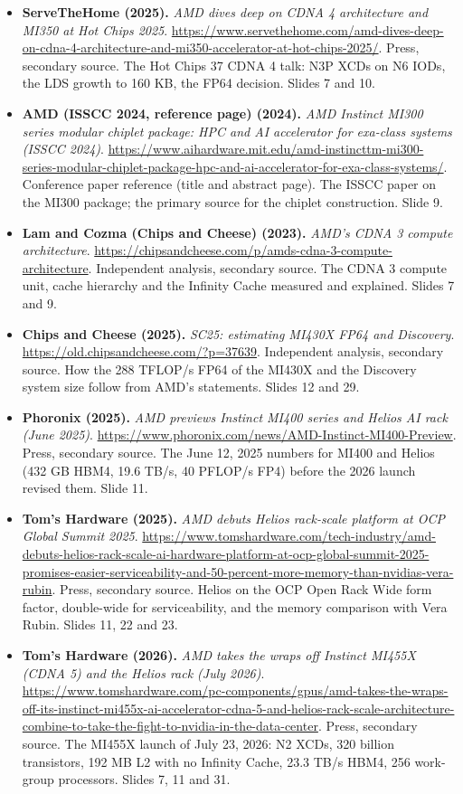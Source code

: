 \begin{itemize}[leftmargin=1.2em,itemsep=3pt]
\item \textbf{ServeTheHome (2025).} \textit{AMD dives deep on CDNA 4 architecture and MI350 at Hot Chips 2025}. \url{https://www.servethehome.com/amd-dives-deep-on-cdna-4-architecture-and-mi350-accelerator-at-hot-chips-2025/}. Press, secondary source. The Hot Chips 37 CDNA 4 talk: N3P XCDs on N6 IODs, the LDS growth to 160 KB, the FP64 decision. Slides 7 and 10.
\item \textbf{AMD (ISSCC 2024, reference page) (2024).} \textit{AMD Instinct MI300 series modular chiplet package: HPC and AI accelerator for exa-class systems (ISSCC 2024)}. \url{https://www.aihardware.mit.edu/amd-instincttm-mi300-series-modular-chiplet-package-hpc-and-ai-accelerator-for-exa-class-systems/}. Conference paper reference (title and abstract page). The ISSCC paper on the MI300 package; the primary source for the chiplet construction. Slide 9.
\item \textbf{Lam and Cozma (Chips and Cheese) (2023).} \textit{AMD's CDNA 3 compute architecture}. \url{https://chipsandcheese.com/p/amds-cdna-3-compute-architecture}. Independent analysis, secondary source. The CDNA 3 compute unit, cache hierarchy and the Infinity Cache measured and explained. Slides 7 and 9.
\item \textbf{Chips and Cheese (2025).} \textit{SC25: estimating MI430X FP64 and Discovery}. \url{https://old.chipsandcheese.com/?p=37639}. Independent analysis, secondary source. How the 288 TFLOP/s FP64 of the MI430X and the Discovery system size follow from AMD's statements. Slides 12 and 29.
\item \textbf{Phoronix (2025).} \textit{AMD previews Instinct MI400 series and Helios AI rack (June 2025)}. \url{https://www.phoronix.com/news/AMD-Instinct-MI400-Preview}. Press, secondary source. The June 12, 2025 numbers for MI400 and Helios (432 GB HBM4, 19.6 TB/s, 40 PFLOP/s FP4) before the 2026 launch revised them. Slide 11.
\item \textbf{Tom's Hardware (2025).} \textit{AMD debuts Helios rack-scale platform at OCP Global Summit 2025}. \url{https://www.tomshardware.com/tech-industry/amd-debuts-helios-rack-scale-ai-hardware-platform-at-ocp-global-summit-2025-promises-easier-serviceability-and-50-percent-more-memory-than-nvidias-vera-rubin}. Press, secondary source. Helios on the OCP Open Rack Wide form factor, double-wide for serviceability, and the memory comparison with Vera Rubin. Slides 11, 22 and 23.
\item \textbf{Tom's Hardware (2026).} \textit{AMD takes the wraps off Instinct MI455X (CDNA 5) and the Helios rack (July 2026)}. \url{https://www.tomshardware.com/pc-components/gpus/amd-takes-the-wraps-off-its-instinct-mi455x-ai-accelerator-cdna-5-and-helios-rack-scale-architecture-combine-to-take-the-fight-to-nvidia-in-the-data-center}. Press, secondary source. The MI455X launch of July 23, 2026: N2 XCDs, 320 billion transistors, 192 MB L2 with no Infinity Cache, 23.3 TB/s HBM4, 256 work-group processors. Slides 7, 11 and 31.

\end{itemize}
